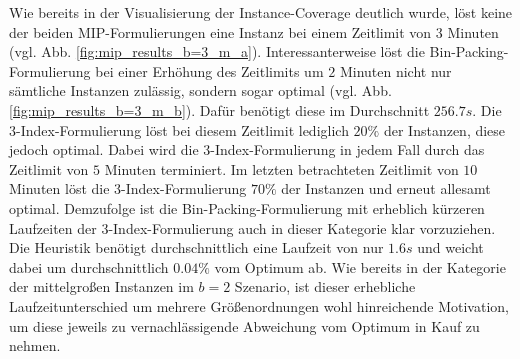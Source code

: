Wie bereits in der Visualisierung der Instance-Coverage deutlich wurde, löst keine der beiden MIP-Formulierungen eine
Instanz bei einem Zeitlimit von $3$ Minuten (vgl. Abb. \ref{fig:mip_results_b=3_m_a}). Interessanterweise löst die Bin-Packing-Formulierung bei einer Erhöhung des Zeitlimits um $2$ Minuten nicht nur sämtliche Instanzen zulässig,
sondern sogar optimal (vgl. Abb. \ref{fig:mip_results_b=3_m_b}). Dafür benötigt diese im Durchschnitt $256.7s$.
Die 3-Index-Formulierung löst bei diesem Zeitlimit lediglich $20 \%$ der Instanzen, diese jedoch optimal.
Dabei wird die 3-Index-Formulierung in jedem Fall durch das Zeitlimit von $5$ Minuten terminiert. Im letzten betrachteten Zeitlimit
von $10$ Minuten löst die 3-Index-Formulierung $70 \%$ der Instanzen und erneut allesamt optimal.
Demzufolge ist die Bin-Packing-Formulierung mit erheblich kürzeren Laufzeiten der 3-Index-Formulierung auch in dieser Kategorie
klar vorzuziehen.\newline
Die Heuristik benötigt durchschnittlich eine Laufzeit von nur $1.6s$ und weicht dabei um durchschnittlich
$0.04 \%$ vom Optimum ab. Wie bereits in der Kategorie der mittelgroßen Instanzen im $b = 2$ Szenario, ist dieser erhebliche
Laufzeitunterschied um mehrere Größenordnungen wohl hinreichende Motivation, um diese jeweils zu vernachlässigende Abweichung
vom Optimum in Kauf zu nehmen.

